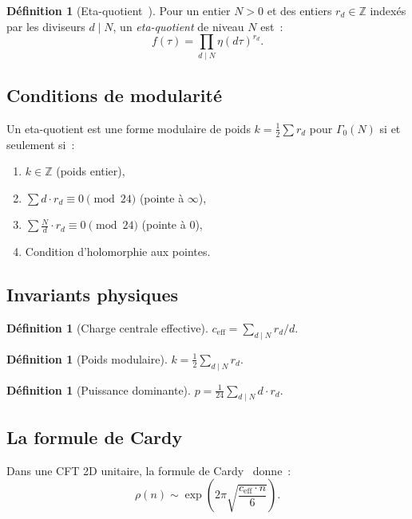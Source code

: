 \documentclass[11pt,a4paper]{article}
\theoremstyle{plain}
\theoremstyle{definition}
\newtheorem{definition}[theorem]{Définition}
\newcommand{\ceff}{c_{\mathrm{eff}}}
\newcommand{\ZZ}{\mathbb{Z}}
\begin{document}
\begin{definition}[Eta-quotient~\cite{martin_1996}]
Pour un entier $N > 0$ et des entiers $r_d \in \ZZ$ indexés
par les diviseurs $d \mid N$, un \emph{eta-quotient} de
niveau $N$ est~:
\begin{equation}
  f(\tau) = \prod_{d \mid N} \eta(d\tau)^{r_d}.
\end{equation}
\end{definition}

\subsection{Conditions de modularité}

Un eta-quotient est une forme modulaire de poids
$k = \frac{1}{2}\sum r_d$ pour $\Gamma_0(N)$ si et
seulement si~:
\begin{enumerate}[label=(M\arabic*)]
  \item $k \in \ZZ$ (poids entier),
  \item $\sum d \cdot r_d \equiv 0 \pmod{24}$ (pointe à $\infty$),
  \item $\sum \frac{N}{d} \cdot r_d \equiv 0 \pmod{24}$ (pointe à $0$),
  \item Condition d'holomorphie aux pointes.
\end{enumerate}

\subsection{Invariants physiques}

\begin{definition}[Charge centrale effective]
$\ceff = \sum_{d \mid N} r_d / d$.
\end{definition}

\begin{definition}[Poids modulaire]
$k = \frac{1}{2} \sum_{d \mid N} r_d$.
\end{definition}

\begin{definition}[Puissance dominante]
$p = \frac{1}{24} \sum_{d \mid N} d \cdot r_d$.
\end{definition}

\subsection{La formule de Cardy}

Dans une CFT 2D unitaire, la formule de
Cardy~\cite{cardy_1986} donne~:
\begin{equation}
  \rho(n) \sim \exp\left(2\pi \sqrt{\frac{\ceff \cdot n}{6}}\right).
\end{equation}
\end{document}
